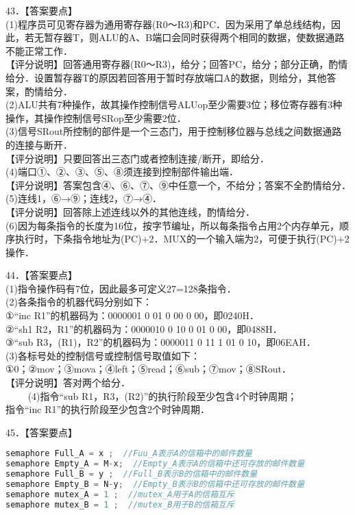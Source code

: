 43．【答案要点】\\
(1)程序员可见寄存器为通用寄存器(R0～R3)和PC．因为采用了单总线结构，因此，若无暂存器T，则ALU的A、B端口会同时获得两个相同的数据，使数据通路不能正常工作．\\
【评分说明】回答通用寄存器(R0～R3)，给分；回答PC，给分；部分正确，酌情给分．设置暂存器T的原因若回答用于暂时存放端口A的数据，则给分，其他答案，酌情给分．\\
(2)ALU共有7种操作，故其操作控制信号ALUop至少需要3位；移位寄存器有3种操作，其操作控制信号SRop至少需要2位．\\
(3)信号SRout所控制的部件是一个三态门，用于控制移位器与总线之间数据通路的连接与断开．\\
【评分说明】只要回答出三态门或者控制连接/断开，即给分．\\(4)端口①、②、③、⑤、⑧须连接到控制部件输出端．\\
【评分说明】答案包含④、⑥、⑦、⑨中任意一个，不给分；答案不全酌情给分．\\
(5)连线1，⑥→⑨；连线2，⑦→④．\\
【评分说明】回答除上述连线以外的其他连线，酌情给分．\\
(6)因为每条指令的长度为16位，按字节编址，所以每条指令占用2个内存单元，顺序执行时，下条指令地址为(PC)+2．MUX的一个输入端为2，可便于执行(PC)+2操作．

44．【答案要点】\\
(1)指令操作码有7位，因此最多可定义27=128条指令．\\
(2)各条指令的机器代码分别如下：\\
①“inc R1”的机器码为：0000001 0 01 0 00 0 00，即0240H．\\
②“sh1 R2，R1”的机器码为：0000010 0 10 0 01 0 00，即0488H．\\
③“sub R3，(R1)，R2”的机器码为：0000011 0 11 1 01 0 10，即06EAH．\\
(3)各标号处的控制信号或控制信号取值如下：\\
①0；②mov；③mova；④left；⑤read；⑥sub；⑦mov；⑧SRout．\\
【评分说明】答对两个给分．\\
$\qquad$ (4)指令“sub R1，R3，(R2)”的执行阶段至少包含4个时钟周期；\\
指令“inc R1”的执行阶段至少包含2个时钟周期．

45．【答案要点】\\
\begin{lstlisting}[language=cpp]
semaphore Full_A = x ;  //Fuu_A表示A的信箱中的邮件数量
semaphore Empty_A = M-x;  //Empty_A表示A的信箱中还可存放的邮件数量
semaphore Full_B = y ;  //Full_B表示B的信箱中的邮件数量
semaphore Empty_B = N-y;  //Empty_B表示B的信箱中还可存放的邮件数量
semaphore mutex_A = 1 ;  //mutex_A用于A的信箱互斥
semaphore mutex_B = 1 ;  //mutex_B用于B的信箱互斥
\end{lstlisting}





